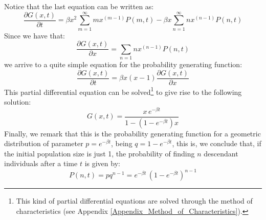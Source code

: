 Notice that the last equation can be written as:
\begin{equation}
\frac{\partial G(x,t)}{\partial t} = \beta x^2 \sum_{m=1}^{\infty} m x^{(m-1)} P(m,t) - \beta x \sum_{n=1}^{\infty}n x^{(n-1)} P(n,t)
\end{equation}
Since we have that:
\begin{equation}
\frac{\partial G(x,t)}{\partial x} = \sum_{n=1} n x^{(n-1)} P(n,t)
\end{equation}
we arrive to a quite simple equation for the probability generating function:
\begin{equation}
\label{eq:GenYule}
\frac{\partial G(x,t)}{\partial t} = \beta x (x-1) \frac{\partial G(x,t)}{\partial x}
\end{equation}
This partial differential equation can be solved\footnote{This kind of partial differential equations are solved through the method of characteristics (see Appendix \ref{Appendix_Method_of_Characteristics}).} to give rise to the following solution:
\begin{equation}
G(x,t) = \frac{x \, e^{-\beta t}}{1 - (1 -e^{-\beta t})x}
\end{equation}
Finally, we remark that this is the probability generating function for a geometric distribution of parameter $p=e^{-\beta t}$, being $q=1-e^{-\beta t}$, this is, we conclude that, if the initial population size is just 1, the probability of finding $n$ descendant individuals after a time $t$ is given by:
\begin{equation}
P(n,t) = p q^{n-1} = e^{-\beta t} \, (1 - e^{-\beta t})^{n-1}
\end{equation}

